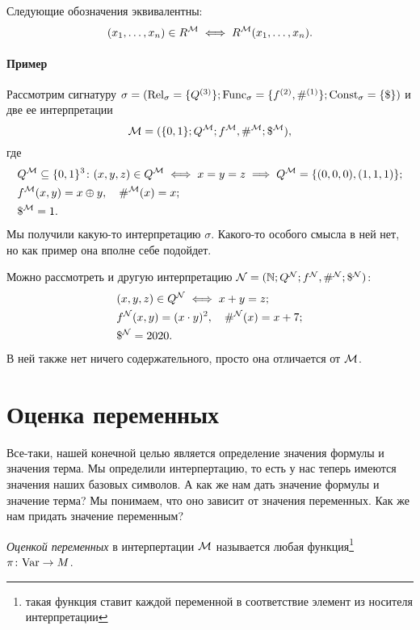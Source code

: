 \begin{convention}
    Следующие обозначения эквивалентны:
    $$
        (x_{1}, \ldots, x_{n}) \in R^{\mathcal{M}} \iff R^{\mathcal{M}}(x_{1}, \ldots, x_{n}). 
    $$
\end{convention}

\paragraph{Пример}
Рассмотрим сигнатуру $\sigma = (\mathrm{Rel}_{\sigma} = \{ Q^{(3)} \}; \mathrm{Func}_{\sigma} = \{ f^{(2)}, \#^{(1)} \}; \mathrm{Const}_{\sigma} = \{ \$ \})$ и две ее интерпретации
$$
    \mathcal{M} = ( \{ 0, 1 \}; Q^{\mathcal{M}}; f^{\mathcal{M}}, \#^{\mathcal{M}}; \$^{\mathcal{M}}),
$$
где 
\begin{align}
    &Q^{\mathcal{M}} \subseteq \{0, 1\}^{3} \colon (x, y, z) \in Q^{\mathcal{M}} \iff x = y = z \implies Q^{\mathcal{M}} = \{ (0, 0, 0), (1, 1, 1)\}; \\
    &f^{\mathcal{M}}(x, y) = x \oplus y, \quad \#^{\mathcal{M}}(x) = x; \\
    &\$^{\mathcal{M}} = 1.
\end{align}
Мы получили какую-то интерпретацию $\sigma$.
Какого-то особого смысла в ней нет, но как пример она вполне себе подойдет.

Можно рассмотреть и другую интерпретацию $\mathcal{N} = (\mathbb{N}; Q^{\mathcal{N}}; f^{\mathcal{N}}, \#^{\mathcal{N}}; \$^{\mathcal{N}})$:
\begin{align}
    &(x, y, z) \in Q^{\mathcal{N}} \iff x + y = z; \\
    &f^{\mathcal{N}}(x, y) = (x \cdot y)^{2}, \quad \#^{\mathcal{N}}(x) = x + 7; \\
    &\$^{\mathcal{N}} = 2020.
\end{align}
В ней также нет ничего содержательного, просто она отличается от $\mathcal{M}$.

\section{Оценка переменных}

Все-таки, нашей конечной целью является определение значения формулы и значения терма.
Мы определили интерпертацию, то есть у нас теперь имеются значения наших базовых символов.
А как же нам дать значение формулы и значение терма?
Мы понимаем, что оно зависит от значения переменных.
Как же нам придать значение переменным?

\begin{definition}
    {\it Оценкой переменных} в интерпертации $\mathcal{M}$ называется любая функция\footnote{такая функция ставит каждой переменной в соответствие элемент из носителя интерпретации} $\pi \colon \mathrm{Var} \to M$.
\end{definition}

